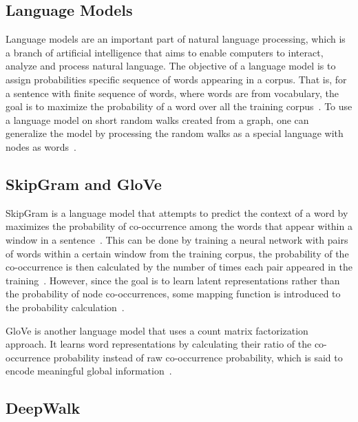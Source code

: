 \subsection{Language Models}

Language models are an important part of natural language processing, which is a branch of artificial intelligence that aims to enable computers to interact, analyze and process natural language.
The objective of a language model is to assign probabilities specific sequence of words appearing in a corpus.
That is, for a sentence with finite sequence of words, where words are from vocabulary, the goal is to maximize the probability of a word over all the training corpus~\cite{perozzi_deepwalk:_2014}.
To use a language model on short random walks created from a graph, one can generalize the model by processing the random walks as a special language with nodes as words~\cite{perozzi_deepwalk:_2014}.

\subsection{SkipGram and GloVe}

SkipGram is a language model that attempts to predict the context of a word by maximizes the probability of co-occurrence among the words that appear within a window in a sentence~\cite{perozzi_deepwalk:_2014}.
This can be done by training a neural network with pairs of words within a certain window from the training corpus, the probability of the co-occurrence is then calculated by the number of times each pair appeared in the training~\cite{mccormick_word2vec_nodate}.
However, since the goal is to learn latent representations rather than the probability of node co-occurrences, some mapping function is introduced to the probability calculation~\cite{perozzi_deepwalk:_2014}.

\ac{GloVe} is another language model that uses a count matrix factorization approach.
It learns word representations by calculating their ratio of the co-occurrence probability instead of raw co-occurrence probability, which is said to encode meaningful global information~\cite{pennington_glove:_2014}.

\subsection{DeepWalk}

